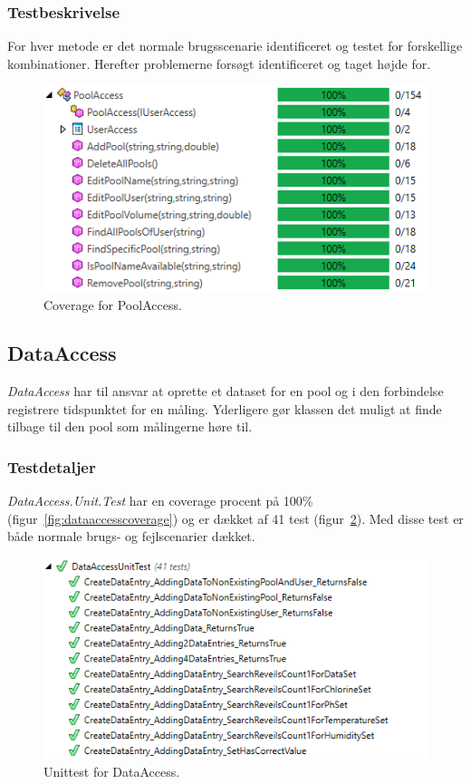 \subsubsection{Testbeskrivelse}
For hver metode er det normale brugsscenarie identificeret og testet for forskellige kombinationer. Herefter problemerne forsøgt identificeret og taget højde for.

\begin{figure}[h]
	\centering
	\includegraphics[width=0.7\linewidth]{figs/test/poolaccesscoverage}
	\caption{Coverage for PoolAccess.}
	\label{fig:poolaccesscoverage}
\end{figure}

\subsection{DataAccess}
\textit{DataAccess} har til ansvar at oprette et dataset for en pool og i den forbindelse registrere tidspunktet for en måling. Yderligere gør klassen det muligt at finde tilbage til den pool som målingerne høre til.

\subsubsection{Testdetaljer}
\textit{DataAccess.Unit.Test} har en coverage procent på 100\% (figur~\ref{fig:dataaccesscoverage}) og er dækket af 41 test (figur~\ref{fig:dataaccessunittest}). Med disse test er både normale brugs- og fejlscenarier dækket.

\begin{figure}[h]
	\centering
	\includegraphics[width=0.9\linewidth]{figs/test/dataaccessunittest}
	\caption{Unittest for DataAccess.}
	\label{fig:dataaccessunittest}
\end{figure}

